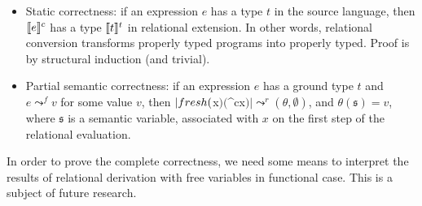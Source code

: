 \begin{itemize}
\item Static correctness: if an expression $e$ has a type $t$ in the source language, then $\llbracket{e}\rrbracket^c$ has a 
type $\llbracket{t}\rrbracket^t$ in relational extension. In other words, relational conversion transforms properly typed
programs into properly typed. Proof is by structural induction (and trivial).
\item Partial semantic correctness: if an expression $e$ has a ground type $t$ and \mbox{$e \leadsto^f v$} for some
  value $v$, then \mbox{$\lstinline|fresh($x$)($^c\;x$)| \leadsto^r (\theta,\emptyset)$}, and 
\mbox{$\theta(\mathfrak{s})=v$}, where $\mathfrak{s}$ is a semantic variable, associated with $x$ on the
first step of the relational evaluation.
\end{itemize}

In order to prove the complete correctness, we need some means to interpret the results of relational 
derivation with free variables in functional case. This is a subject of future research.
